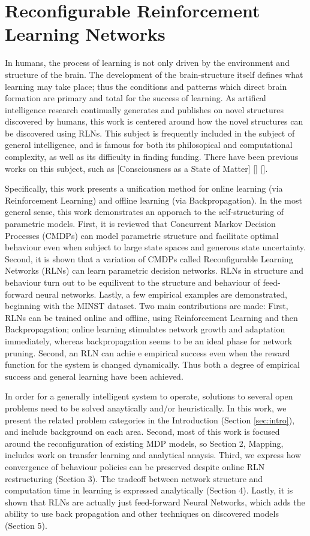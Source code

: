 \section*{ Reconfigurable Reinforcement Learning Networks}

In humans, the process of learning is not only driven by the environment and structure of the brain. The development of the brain-structure itself defines what learning may take place; thus the conditions and patterns which direct brain formation are primary and total for the success of learning. As artifical intelligence research continually generates and publishes on novel structures discovered by humans, this work is centered around how the novel structures can be discovered using RLNs. This subject is frequently included in the subject of general intelligence, and is famous for both its philosopical and computational complexity, as well as its difficulty in finding funding. There have been previous works on this subject, such as [Consciousness as a State of Matter] [] []. 

Specifically, this work presents a unification method for online learning (via Reinforcement Learning) and offline learning (via Backpropagation). In the most general sense, this work demonstrates an apporach to the self-structuring of parametric models. First, it is reviewed that Concurrent Markov Decision Processes (CMDPs) can model parametric structure and facilitate optimal behaviour even when subject to large state spaces and generous state uncertainty. Second, it is shown that a variation of CMDPs called Reconfigurable Learning Networks (RLNs) can learn parametric decision networks. RLNs in structure and behaviour turn out to be equilivent to the structure and behaviour of feed-forward neural networks. Lastly, a few empirical examples are demonstrated, beginning with the MINST dataset. Two main contributions are made: First, RLNs can be trained online and offline, using Reinforcement Learning and then Backpropagation; online learning stimulates network growth and adaptation immediately, whereas backpropagation seems to be an ideal phase for network pruning.  Second, an RLN can achie e empirical success even when the reward function for the system is changed dynamically. Thus both a degree of empirical success and general learning have been achieved.

In order for a generally intelligent system to operate, solutions to several open problems need to be solved anaytically and/or heuristically. In this work, we present the related problem categories in the Introduction (Section \ref{sec:intro}), and include background on each area. Second, most of this work is focused around the reconfiguration of existing MDP models, so Section 2, Mapping, includes work on transfer learning and analytical anaysis. Third, we express how convergence of behaviour policies can be preserved despite online RLN restructuring (Section 3). The tradeoff between network structure and computation time  in learning is expressed analytically (Section 4). Lastly, it is shown that RLNs are actually just feed-forward Neural Networks, which adds the ability to use back propagation and other techniques on discovered models (Section 5).


